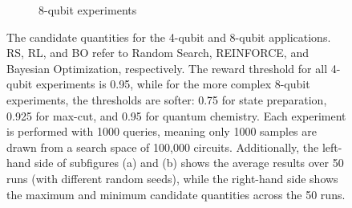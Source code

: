 \documentclass{article} %
\begin{document}
\begin{figure}[htbp]
\begin{subfigure}[b]{0.48\textwidth}
\begin{minipage}[b]{0.28\textwidth}
        \end{minipage}
    \caption{8-qubit experiments}
    \label{8-qubits_candidates}
    \end{subfigure}
    \caption{The candidate quantities for the 4-qubit and 8-qubit applications. RS, RL, and BO refer to Random Search, REINFORCE, and Bayesian Optimization, respectively. The reward threshold for all 4-qubit experiments is 0.95, while for the more complex 8-qubit experiments, the thresholds are softer: 0.75 for state preparation, 0.925 for max-cut, and 0.95 for quantum chemistry. Each experiment is performed with 1000 queries, meaning only 1000 samples are drawn from a search space of 100,000 circuits. Additionally, the left-hand side of subfigures (a) and (b) shows the average results over 50 runs (with different random seeds), while the right-hand side shows the maximum and minimum candidate quantities across the 50 runs.}
    \label{candidates}
\end{figure}

\end{document}
